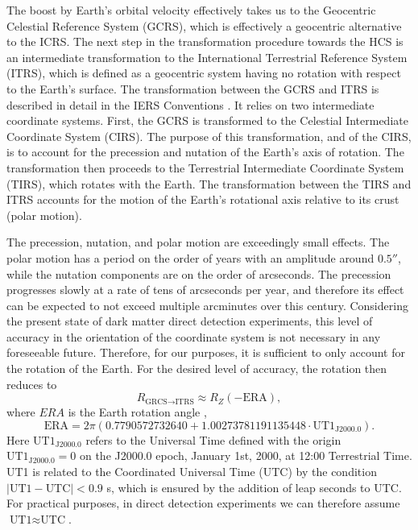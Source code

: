 \documentclass[b5paper, 10pt, twoside]{book}
\begin{document}
The boost by Earth's orbital velocity effectively takes us to the Geocentric Celestial Reference System (GCRS), which is effectively a geocentric alternative to the ICRS. The next step in the transformation procedure towards the HCS is an intermediate transformation to the International Terrestrial Reference System (ITRS), which is defined as a geocentric system having no rotation with respect to the Earth's surface. The transformation between the GCRS and ITRS is described in detail in the IERS Conventions \parencite{LuzumPetit2010}. It relies on two intermediate coordinate systems. First, the GCRS is transformed to the Celestial Intermediate Coordinate System (CIRS). The purpose of this transformation, and of the CIRS, is to account for the precession and nutation of the Earth's axis of rotation. The transformation then proceeds to the Terrestrial Intermediate Coordinate System (TIRS), which rotates with the Earth. The transformation between the TIRS and ITRS accounts for the motion of the Earth's rotational axis relative to its crust (polar motion).

The precession, nutation, and polar motion are exceedingly small effects. The polar motion has a period on the order of years with an amplitude around $0.5''$, while the nutation components are on the order of arcseconds. The precession progresses slowly at a rate of tens of arcseconds per year, and therefore its effect can be expected to not exceed multiple arcminutes over this century. Considering the present state of dark matter direct detection experiments, this level of accuracy in the orientation of the coordinate system is not necessary in any foreseeable future. Therefore, for our purposes, it is sufficient to only account for the rotation of the Earth. For the desired level of accuracy, the rotation then reduces to
\begin{equation}
    R_{\text{GRCS}\rightarrow\text{ITRS}}\approx R_Z(-\text{ERA}),
\end{equation}
where $ERA$ is the Earth rotation angle \parencite{LuzumPetit2010},
\begin{equation}
    \text{ERA}=2\pi(0.7790572732640+1.00273781191135448\cdot\text{UT1}_\text{J2000.0}).
\end{equation}
Here $\text{UT1}_\text{J2000.0}$ refers to the Universal Time defined with the origin $\text{UT1}_\text{J2000.0}=0$ on the J2000.0 epoch, January 1st, 2000, at 12:00 Terrestrial Time. UT1 is related to the Coordinated Universal Time (UTC) by the condition $|\text{UT1}-\text{UTC}|<0.9$ s, which is ensured by the addition of leap seconds to UTC. For practical purposes, in direct detection experiments we can therefore assume $\text{UT1}\approx\text{UTC}$.
\end{document}
